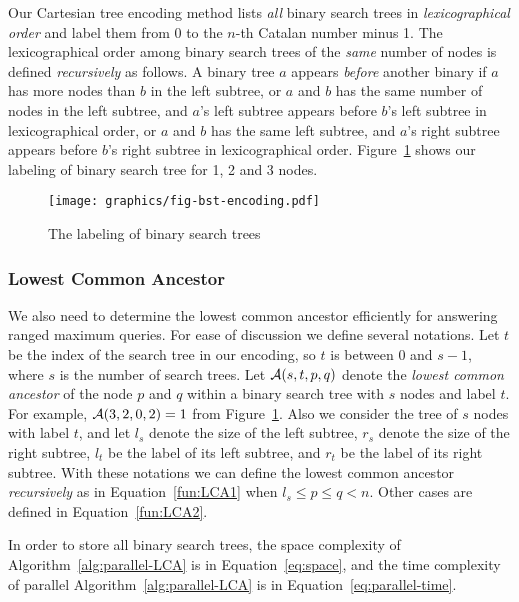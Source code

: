 Our Cartesian tree encoding method lists {\em all} binary search trees
in {\em lexicographical order} and label them from $0$ to the $n$-th
Catalan number minus 1.  The lexicographical order among binary search
trees of the {\em same} number of nodes is defined {\em recursively}
as follows.  A binary tree $a$ appears {\em before} another binary if
$a$ has more nodes than $b$ in the left subtree, or $a$ and $b$ has
the same number of nodes in the left subtree, and $a$'s left subtree
appears before $b$'s left subtree in lexicographical order, or $a$ and
$b$ has the same left subtree, and $a$'s right subtree appears before
$b$'s right subtree in lexicographical order.
Figure~\ref{fig:labelingBST} shows our labeling of binary search tree
for 1, 2 and 3 nodes.

\begin{figure}[!thb]
  \centering
  \texttt{[image: graphics/fig-bst-encoding.pdf]}
  \caption{The labeling of binary search trees}
  \label{fig:labelingBST}
\end{figure}

\subsubsection{Lowest Common Ancestor}

We also need to determine the lowest common ancestor efficiently for
answering ranged maximum queries.  For ease of discussion we define
several notations.  Let $t$ be the index of the search tree in our
encoding, so $t$ is between 0 and $s - 1$, where $s$ is the number of
search trees.  Let ${\cal A}(s, t, p, q)$ denote the {\em lowest
  common ancestor} of the node $p$ and $q$ within a binary search tree
with $s$ nodes and label $t$.  For example, ${\cal A}(3, 2, 0, 2) = 1$
from Figure~\ref{fig:labelingBST}.  Also we consider the tree of $s$
nodes with label $t$, and let $l_s$ denote the size of the left
subtree, $r_s$ denote the size of the right subtree, $l_t$ be the
label of its left subtree, and $r_t$ be the label of its right
subtree.  With these notations we can define the lowest common
ancestor {\em recursively} as in Equation~\ref{fun:LCA1} when $l_s
\le p \le q < n$.  Other cases are defined in Equation~\ref{fun:LCA2}.



In order to store all binary search trees, the space complexity of
Algorithm~\ref{alg:parallel-LCA} is in Equation~\ref{eq:space}, and the
time complexity of parallel Algorithm~\ref{alg:parallel-LCA} is in
Equation~\ref{eq:parallel-time}.

